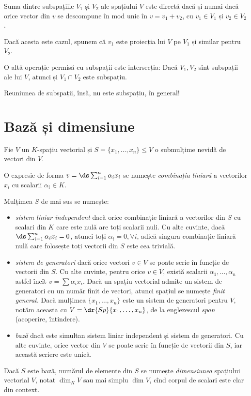 \begin{proposition}\label{prop:suma-dir}
  Suma dintre subspațiile $ V_1 $ și $ V_2 $ ale spațiului $ V $ este directă dacă și 
  numai dacă orice vector din $ v $ se descompune în mod unic în $ v = v_1 + v_2 $,
  cu $ v_1 \in V_1 $ și $ v_2 \in V_2 $.

  Dacă acesta este cazul, spunem că $ v_1 $ este proiecția lui $ V $ pe $ V_1 $ și
  similar pentru $ V_2 $.
\end{proposition}

O altă operație permisă cu subspații este intersecția: Dacă $ V_1, V_2 $ sînt subspații
ale lui $ V $, atunci și $ V_1 \cap V_2 $ este subspațiu.

Reuniunea de subspații, însă, nu este subspațiu, în general!

\section{Bază și dimensiune}

Fie $ V $ un $ K $-spațiu vectorial și $ S = \{ x_1, \dots, x_n \} \leq V $ o submulțime
nevidă de vectori din $ V $.

O expresie de forma $ v = \ds\sum_{i = 1}^n \alpha_i x_i $ se numește \emph{combinația %
  liniară} a vectorilor $ x_i $ cu scalarii $ \alpha_i \in K $.

\begin{definition}\label{def:indep-sg-baza}
  Mulțimea $ S $ de mai sus se numește:
  \begin{itemize}
  \item \emph{sistem liniar independent} dacă orice combinație liniară a vectorilor
    din $ S $ cu scalari din $ K $ care este nulă are toți scalarii nuli.
    Cu alte cuvinte, dacă $ \ds\sum_{i=1}^n \alpha_i x_i = 0 $, atunci toți
    $ \alpha_i = 0, \forall i $, adică singura combinație liniară nulă care
    folosește toți vectorii din $ S $ este cea trivială.
  \item \emph{sistem de generatori} dacă orice vectori $ v \in V $ se poate
    scrie în funcție de vectorii din $ S $. Cu alte cuvinte, pentru orice
    $ v \in V $, există scalarii $ \alpha_1, \dots, \alpha_n $
    astfel încît $ v = \sum \alpha_i x_i $. Dacă un spațiu vectorial admite
    un sistem de generatori cu un număr finit de vectori, atunci spațiul
    se numește \emph{finit generat}. Dacă mulțimea $ \{x_1, \dots, x_n \} $
    este un sistem de generatori pentru $ V $, notăm aceasta cu
    $ V = \dr{Sp}\{x_1, \dots, x_n\} $, de la englezescul \emph{span} (acoperire, întindere).
  \item \emph{bază} dacă este simultan sistem liniar independent și sistem
    de generatori. Cu alte cuvinte, orice vector din $ V $ se poate scrie
    în funcție de vectorii din $ S $, iar această scriere este unică.
  \end{itemize}
  Dacă $ S $ este bază, numărul de elemente din $ S $ se numește \emph{dimensiunea}
  spațiului vectorial $ V $, notat $ \dim_K V $ sau mai simplu $ \dim V $, cînd
  corpul de scalari este clar din context.
\end{definition}

